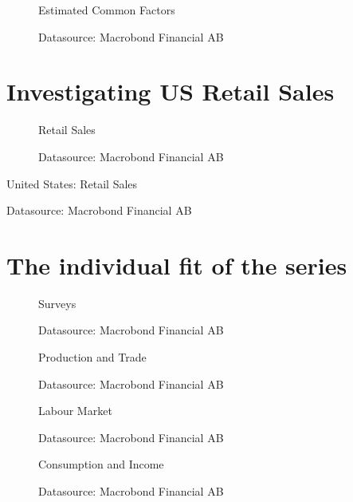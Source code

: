 \documentclass[12pt]{article}
\begin{document}
\begin{figure}[ht]
	\centering
	\caption{Estimated Common Factors}
	\caption*{\small{Datasource: Macrobond Financial AB}}
\end{figure}
\FloatBarrier
\section{Investigating US Retail Sales}


\begin{figure}[ht]
	\centering
	\caption{Retail Sales}
	\caption*{\small{Datasource: Macrobond Financial AB}}
\end{figure}


\begin{table}[ht]
	\caption{United States: Retail Sales}
	
	\label{tab:tableRetail}
	\centering
	\caption*{\small{Datasource: Macrobond Financial AB}}
\end{table}

\FloatBarrier
\section{The individual fit of the series}



\begin{figure}[ht]
	\centering
	\caption{Surveys}
	\caption*{\small{Datasource: Macrobond Financial AB}}
\end{figure}



\begin{figure}[ht]
	\centering
	\caption{Production and Trade}
	\caption*{\small{Datasource: Macrobond Financial AB}}
\end{figure}


\begin{figure}[ht]
	\centering
	\caption{Labour Market}
	\caption*{\small{Datasource: Macrobond Financial AB}}
\end{figure}


\begin{figure}[ht]
	\centering
	\caption{Consumption and Income}
	\caption*{\small{Datasource: Macrobond Financial AB}}
\end{figure}
\end{document}

